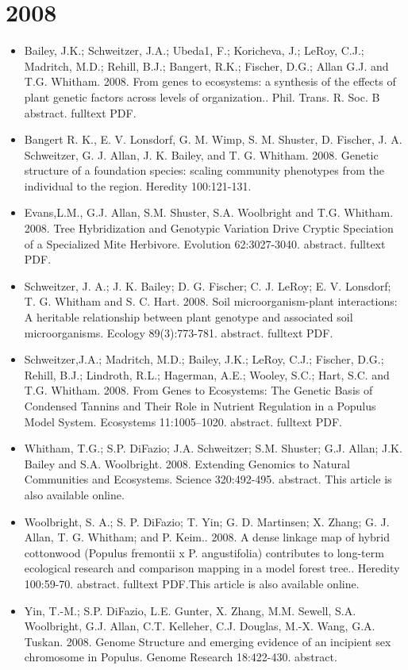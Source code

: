 \documentclass[12pt]{article}
\begin{document}
\section{2008}
\begin{itemize}
\item Bailey, J.K.; Schweitzer, J.A.; Ubeda1, F.; Koricheva, J.; LeRoy,
C.J.; Madritch, M.D.; Rehill, B.J.; Bangert, R.K.; Fischer, D.G.;
Allan G.J. and T.G. Whitham. 2008. From genes to ecosystems: a
synthesis of the effects of plant genetic factors across levels of
organization.. Phil. Trans. R. Soc. B abstract. fulltext PDF.

\item Bangert R. K., E. V. Lonsdorf, G. M. Wimp, S. M. Shuster, D. Fischer,
J. A. Schweitzer, G. J. Allan, J. K. Bailey, and
T. G. Whitham. 2008. Genetic structure of a foundation species:
scaling community phenotypes from the individual to the
region. Heredity 100:121-131.

\item Evans,L.M., G.J. Allan, S.M. Shuster, S.A. Woolbright and
T.G. Whitham. 2008. Tree Hybridization and Genotypic Variation Drive
Cryptic Speciation of a Specialized Mite Herbivore. Evolution
62:3027-3040. abstract. fulltext PDF.

\item Schweitzer, J. A.; J. K. Bailey; D. G. Fischer; C. J. LeRoy;
E. V. Lonsdorf; T. G. Whitham and S. C. Hart. 2008. Soil
microorganism-plant interactions: A heritable relationship between
plant genotype and associated soil microorganisms. Ecology
89(3):773-781. abstract. fulltext PDF.

\item Schweitzer,J.A.; Madritch, M.D.; Bailey, J.K.; LeRoy, C.J.; Fischer,
D.G.; Rehill, B.J.; Lindroth, R.L.; Hagerman, A.E.; Wooley, S.C.;
Hart, S.C. and T.G. Whitham. 2008. From Genes to Ecosystems: The
Genetic Basis of Condensed Tannins and Their Role in Nutrient
Regulation in a Populus Model System. Ecosystems
11:1005–1020. abstract. fulltext PDF.

\item Whitham, T.G.; S.P. DiFazio; J.A. Schweitzer; S.M. Shuster;
G.J. Allan; J.K. Bailey and S.A. Woolbright. 2008. Extending Genomics
to Natural Communities and Ecosystems. Science
320:492-495. abstract. This article is also available online.
 
\item Woolbright, S. A.; S. P. DiFazio; T. Yin; G. D. Martinsen; X. Zhang;
G. J. Allan, T. G. Whitham; and P. Keim.. 2008. A dense linkage map of
hybrid cottonwood (Populus fremontii x P. angustifolia) contributes to
long-term ecological research and comparison mapping in a model forest
tree.. Heredity 100:59-70. abstract. fulltext PDF.This article is also
available online.

\item Yin, T.-M.; S.P. DiFazio, L.E. Gunter, X. Zhang, M.M. Sewell,
S.A. Woolbright, G.J. Allan, C.T. Kelleher, C.J. Douglas, M.-X. Wang,
G.A. Tuskan. 2008. Genome Structure and emerging evidence of an
incipient sex chromosome in Populus. Genome Research
18:422-430. abstract.
 
\end{itemize}
\end{document}
